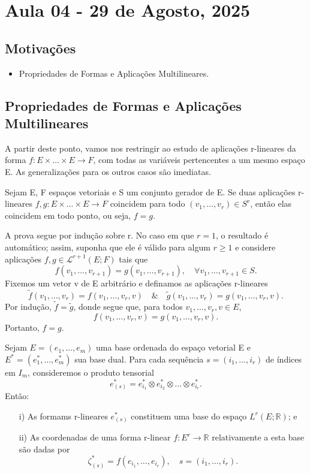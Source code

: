 \documentclass[../differential_forms.tex]{subfiles}
\begin{document}
\section{Aula 04 - 29 de Agosto, 2025}
\subsection{Motivações}
\begin{itemize}
	\item Propriedades de Formas e Aplicações Multilineares.
\end{itemize}
\subsection{Propriedades de Formas e Aplicações Multilineares}
A partir deste ponto, vamos nos restringir ao estudo de aplicações r-lineares da forma \(f:E\times \dotsc \times E\rightarrow F\), com todas as variáveis pertencentes a um mesmo espaço E. As generalizações para os outros casos são imediatas.
\begin{prop*}
	Sejam E, F espaços vetoriais e S um conjunto gerador de E. Se duas aplicações r-lineares \(f, g:E\times \dotsc \times E\rightarrow F\) coincidem para todo \((v_1,\dotsc ,v_{r})\in S^{r}\), então elas coincidem em todo ponto, ou seja, \(f=g\).
\end{prop*}
\begin{proof*}
	A prova segue por indução sobre r. No caso em que \(r=1\), o resultado é automático; assim, suponha que ele é válido para algum \(r\geq 1\) e considere aplicações \(f, g\in \mathcal{L}^{r+1}(E; F)\) tais que
	\[
		f(v_1,\dotsc ,v_{r+1})=g(v_{1}, \dotsc , v_{r+1}),\quad \forall v_1,\dotsc ,v_{r+1}\in S.
	\]
	Fixemos um vetor v de E arbitrário e definamos as aplicações r-lineares
	\[
		\tilde{f}(v_1,\dotsc ,v_{r})=f(v_{1},\dotsc , v _{r}, v) \quad\&\quad \tilde{g}(v_1,\dotsc ,v_{r})=g(v_{1},\dotsc , v_{r}, v).
	\]
	Por indução, \(\tilde{f}=\tilde{g}\), donde segue que, para todos \(v_1,\dotsc , v_r, v\in E\),
	\[
		f(v_{1},\dotsc , v_{r}, v)=g(v_{1},\dotsc , v_{r}, v).
	\]
	Portanto, \(f=g\). \qedsymbol
\end{proof*}
\begin{prop*}
	Sejam \(E=(e_1,\dotsc ,e_{m})\) uma base ordenada do espaço vetorial E e \(E^{*}=(e_{1}^{*}, \dotsc , e_{m}^{*})\) sua base dual. Para cada sequência \(s=(i_1,\dotsc ,i_{r})\) de índices em \(I_{m}\), consideremos o produto tensorial
	\[
		e_{(s)}^{*}=e_{i_1}^{*}\otimes e_{i_2}^{*}\otimes \dotsc \otimes e_{i_r}^{*}.
	\]
	Então:
	\begin{itemize}
		\item[i)] As formams r-lineares \(e_{(s)}^{*}\) constituem uma base do espaço \(L^{r}(E; \mathbb{R})\); e
		\item[ii)] As coordenadas de uma forma r-linear \(f:E^{r}\rightarrow \mathbb{R}\) relativamente a esta base são dadas por
		      \[
			      \zeta_{(s)}^{*}= f(e_{i_1}, \dotsc , e_{i_r}), \quad s=(i_1,\dotsc ,i_{r}).
		      \]
	\end{itemize}
\end{prop*}
\end{document}
